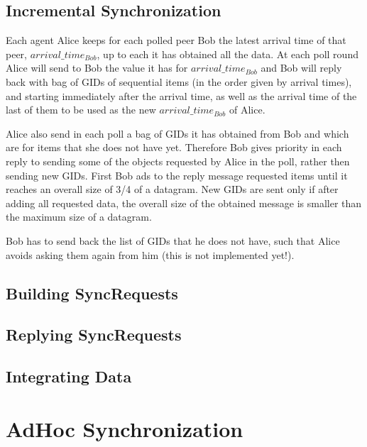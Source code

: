 \documentclass{book}
\begin{document}
\section{Incremental Synchronization}

Each agent Alice keeps for each polled peer Bob the latest arrival time of that peer, $arrival\_time_{Bob}$, up to each it has obtained all the data.
At each poll round Alice will send to Bob the value it has for $arrival\_time_{Bob}$ and Bob will reply
back with bag of GIDs of sequential items (in the order given by arrival times), and starting immediately after the arrival time,
as well as the arrival time of the last of them to be used as the new $arrival\_time_{Bob}$ of Alice.

Alice also send in each poll a bag of GIDs it has obtained from Bob and which are for items that she does not have yet.
Therefore Bob gives priority in each reply to sending some of the objects requested by Alice in the poll, rather then 
sending new GIDs. First Bob ads to the reply message requested items until it reaches an overall size
of 3/4 of a datagram. 
New GIDs are sent only if after adding all requested data, the overall size of the obtained message is smaller than the maximum size of a datagram.

Bob has to send back the list of GIDs that he does not have, such that Alice avoids asking them again from him (this is not implemented yet!).

\section{Building SyncRequests}

\section{Replying SyncRequests}

\section{Integrating Data}

\chapter{AdHoc Synchronization}
\end{document}
